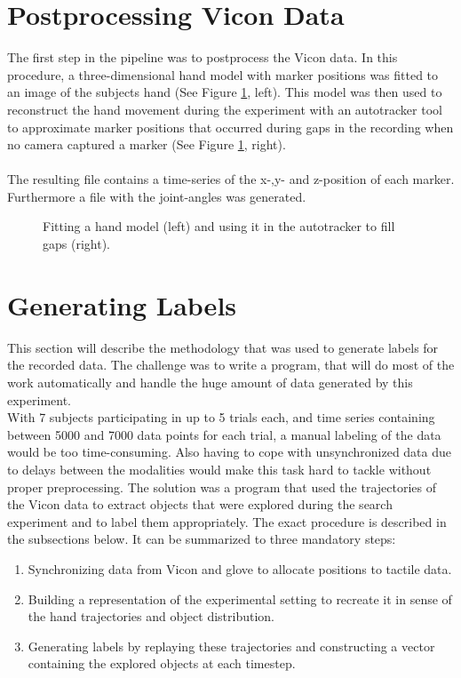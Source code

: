 \section{Postprocessing Vicon Data}
The first step in the pipeline was to postprocess the Vicon data. In this procedure, a three-dimensional hand model with marker positions was fitted to an image of the subjects hand (See Figure \ref{autotracker}, left). This model was then used to reconstruct the hand movement during the experiment with an autotracker tool \cite{autotracker} to approximate marker positions that occurred during gaps in the recording when no camera captured a marker  (See Figure \ref{autotracker}, right).\\
\\
The resulting file contains a time-series of the x-,y- and z-position of each marker. Furthermore a file with the joint-angles was generated.

\begin{figure}[h]
	\caption{Fitting a hand model (left) and using it in the autotracker to fill gaps (right).}
	\label{autotracker}
\end{figure}
\section{Generating Labels}
This section will describe the methodology that was used to generate labels for the recorded data. The challenge was to write a program, that will do most of the work automatically and handle the huge amount of data generated by this experiment.\\
With 7 subjects participating in up to 5 trials each, and time series containing between 5000 and 7000 data points for each trial, a manual labeling of the data would be too time-consuming. Also having to cope with unsynchronized data due to delays between the modalities would make this task hard to tackle without proper preprocessing. The solution was a program that used the trajectories of the Vicon data to extract objects that were explored during the search experiment and to label them appropriately. The exact procedure is described in the subsections below. It can be summarized to three mandatory steps:
\begin{enumerate}
	\item Synchronizing data from Vicon and glove to allocate positions to tactile data.
	\item Building a representation of the experimental setting to recreate it in sense of the hand trajectories and object distribution.
	\item Generating labels by replaying these trajectories and constructing a vector containing the explored objects at each timestep.
\end{enumerate}


